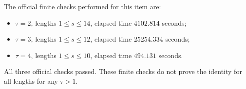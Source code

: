 \documentclass{article}
\begin{document}
The official finite checks performed for this item are:
\begin{itemize}
\item \(\tau=2\), lengths \(1 \leq s \leq 14\), elapsed time
      \(4102.814\) seconds;
\item \(\tau=3\), lengths \(1 \leq s \leq 12\), elapsed time
      \(25254.334\) seconds;
\item \(\tau=4\), lengths \(1 \leq s \leq 10\), elapsed time
      \(494.131\) seconds.
\end{itemize}
All three official checks passed.  These finite checks do not prove the
identity for all lengths for any \(\tau>1\).
\end{document}
